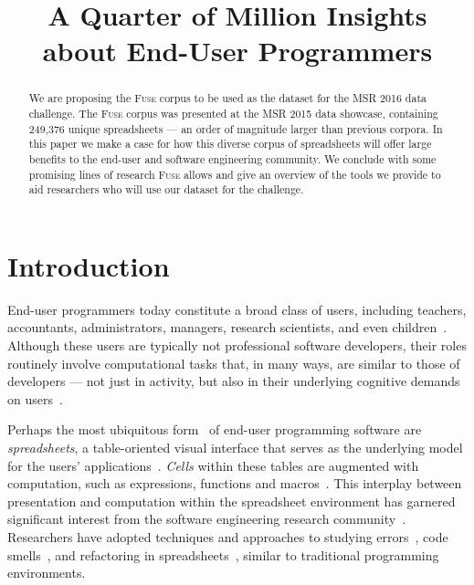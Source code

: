 \documentclass[conference]{IEEEtran}
\newcommand{\xlscount}{249,376}
\begin{document}
\title{A Quarter of Million Insights about End-User Programmers}

\author{
}


\maketitle

\begin{abstract}
We are proposing the \textsc{Fuse} corpus to be used as the dataset for the MSR 2016 data challenge.
The \textsc{Fuse} corpus was presented at the MSR 2015 data showcase, containing \xlscount{} unique spreadsheets --- an order of magnitude larger than previous corpora.
In this paper we make a case for how this diverse corpus of spreadsheets will offer large benefits to the end-user and software engineering community.
We conclude with some promising lines of research \textsc{Fuse} allows and give an overview of the tools we provide to aid researchers who will use our dataset for the challenge.

\end{abstract}


\IEEEpeerreviewmaketitle

\section{Introduction}

End-user programmers today constitute a broad class of users, including teachers, accountants, administrators, managers, research scientists, and even children~\cite{Ko2011}.
Although these users are typically not professional software developers, their roles routinely involve computational tasks that, in many ways, are similar to those of developers --- not just in activity, but also in their underlying cognitive demands on users~\cite{Blackwell2002}. 

Perhaps the most ubiquitous form~\cite{Scaffidi2005} of end-user programming software are \emph{spreadsheets}, a table-oriented visual interface that serves as the underlying model for the users' applications~\cite{Nardi1990}. \emph{Cells} within these tables are augmented with computation, such as expressions, functions and macros~\cite{Nardi1990}. 
This interplay between presentation and computation within the spreadsheet environment has garnered significant interest from the software engineering research community~\cite{Burnett2009}. 
Researchers have adopted techniques and approaches to studying errors~\cite{Powell2008}, code smells~\cite{Pinzger2012}, and refactoring in spreadsheets~\cite{Badame2012}, similar to traditional programming environments. 
\end{document}
